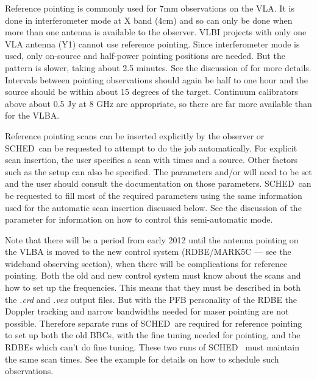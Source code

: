 \documentclass{report}
\newcommand{\schedb}{{\sc SCHED~}}
\begin{document}
Reference pointing is commonly used for 7mm observations on the VLA.
It is done in interferometer mode at X band (4cm) and so can only be done
when more than one antenna is available to the observer.  VLBI
projects with only one VLA antenna (Y1) cannot use reference pointing.
Since interferometer mode is used, only on-source and half-power
pointing positions are needed.  But the pattern is slower, taking
about 2.5 minutes.  See the discussion of  for more details.  Intervals between pointing
observations should again be half to one hour and the source should
be within about 15 degrees of the target.  Continuum calibrators above
about 0.5 Jy at 8 GHz are appropriate, so there are far more available
than for the VLBA.

Reference pointing scans can be inserted explicitly by the observer or
\schedb can be requested to attempt to do the job automatically.  For
explicit scan insertion, the user specifies a scan with times and a
source.  Other factors such as the setup can also be specified.  The
parameters  and/or  will need to be set and the user should consult
the documentation on those parameters.  \schedb can be requested to
fill most of the required parameters using the same information used
for the automatic scan insertion discussed below.  See the discussion
of the parameter  for information on
how to control this semi-automatic mode.

Note that there will be a period from early 2012 until the antenna
pointing on the VLBA is moved to the new control system (RDBE/MARK5C ---
see the wideband observing section), when there will be complications
for reference pointing.  Both the old and new control system must know
about the scans and how to set up the frequencies.  This means that
they must be described in both the {\sl .crd} and {\sl .vex} output
files.  But with the PFB personality of the RDBE the Doppler tracking
and narrow bandwidths needed for maser pointing are not possible.
Therefore separate runs of \schedb are required for reference pointing
to set up both the old BBCs, with the fine tuning needed for pointing,
and the RDBEs which can't do fine tuning.  These two runs of \schedb
must maintain the same scan times.  See the example
 for
details on how to schedule such observations.
\end{document}
